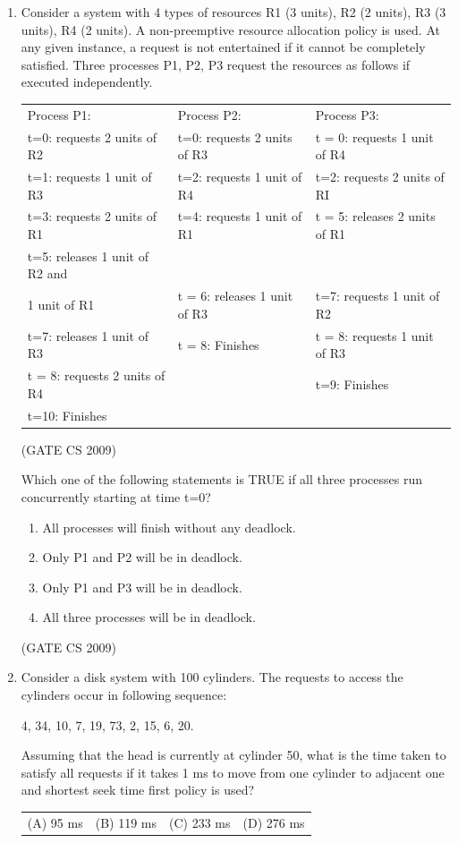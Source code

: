 \documentclass[a4paper, 11pt]{article}
\begin{document}
\begin{enumerate}
    \item Consider a system with 4 types of resources R1 (3 units), R2 (2 units), R3 (3 units), R4 (2 units). A non-preemptive resource allocation policy is used. At any given instance, a request is not entertained if it cannot be completely satisfied. Three processes P1, P2, P3 request the resources as follows if executed independently.\\
    \begin{tabular}{|l|l|l|}
    \hline
        Process P1: & Process P2: & Process P3: \\
        t=0: requests 2 units of R2 & t=0: requests 2 units of R3 & t = 0: requests 1 unit of R4 \\
        t=1: requests 1 unit of R3 & t=2: requests 1 unit of R4 & t=2: requests 2 units of RI \\
        t=3: requests 2 units of R1 & t=4: requests 1 unit of R1 & t = 5: releases 2 units of R1 \\
        t=5: releases 1 unit of R2 and\\ 1 unit of R1 & t = 6: releases 1 unit of R3 & t=7: requests 1 unit of R2 \\
        t=7: releases 1 unit of R3 & t = 8: Finishes & t = 8: requests 1 unit of R3 \\
        t = 8: requests 2 units of R4 &  &  t=9: Finishes \\
        t=10: Finishes &  & \\
        \hline
    \end{tabular}

    \hfill (GATE CS 2009)

    Which one of the following statements is TRUE if all three processes run concurrently starting at time t=0?
    \begin{enumerate}[label=(\Alph*)]
        \item All processes will finish without any deadlock.
        \item Only P1 and P2 will be in deadlock.
        \item Only P1 and P3 will be in deadlock.
        \item All three processes will be in deadlock.
    \end{enumerate}

    \hfill (GATE CS 2009)

    \item Consider a disk system with 100 cylinders. The requests to access the cylinders occur in following sequence:
    \begin{center}
        4, 34, 10, 7, 19, 73, 2, 15, 6, 20.
    \end{center}
    Assuming that the head is currently at cylinder 50, what is the time taken to satisfy all requests if it takes 1 ms to move from one cylinder to adjacent one and shortest seek time first policy is used?\\
    \begin{tabularx}{\textwidth}{@{}XXXX@{}}
       (A) 95 ms  & (B) 119 ms & (C) 233 ms & (D) 276 ms  \\
    \end{tabularx}


\end{enumerate}
\end{document}
